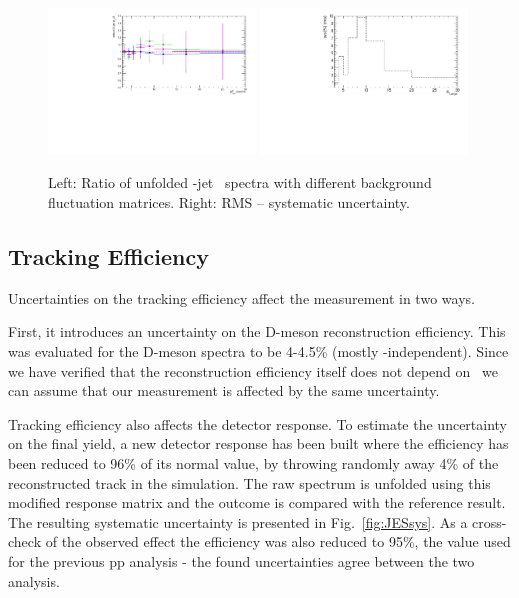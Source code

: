 \begin{figure}[bth]
\centering
\includegraphics[width=0.49\textwidth]{pPbplots/unfolding/jetSpectraRatio_afterUnfolding_bkgFlucSys}
\includegraphics[width=0.49\textwidth]{pPbplots/unfolding/jetSpectraSys_afterUnfolding_bkgFlucSys}
\caption{ Left: Ratio of unfolded \Dstar-jet \pt\ spectra with different background fluctuation matrices. Right: RMS -- systematic uncertainty.}
\label{fig:BkgFlucSys}
\end{figure}


\subsection{Tracking Efficiency}
Uncertainties on the tracking efficiency affect the measurement in two ways. 

First, it introduces an uncertainty on the D-meson reconstruction efficiency. This was evaluated for the D-meson spectra to be 4-4.5\% (mostly \pt-independent). Since we have verified that the reconstruction efficiency itself does not depend on \ptchjet\ we can assume that our measurement is affected by the same uncertainty.


Tracking efficiency also affects the detector response. To estimate the uncertainty on the final yield, a new detector response has been built where the efficiency has been reduced to 96\% of its normal value, by throwing randomly away 4\% of the reconstructed track in the simulation.
The raw spectrum is unfolded using this modified response matrix and the outcome is compared with the reference result. The resulting systematic uncertainty is presented in Fig.~\ref{fig:JESsys}. As a cross-check of the observed effect the efficiency was also reduced to 95\%, the value used for the previous pp analysis - the found uncertainties agree between the two analysis.

